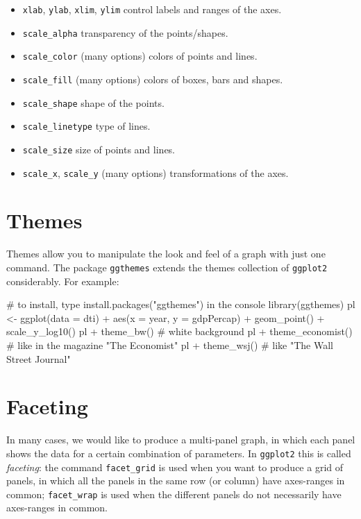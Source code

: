 \documentclass[
  letterpaper,
  DIV=11,
  numbers=noendperiod]{scrreprt}
\newenvironment{Shaded}{\begin{snugshade}}{\end{snugshade}}
\newcommand{\NormalTok}[1]{\textcolor[rgb]{0.00,0.23,0.31}{#1}}
\providecommand{\tightlist}{%
  \setlength{\itemsep}{0pt}\setlength{\parskip}{0pt}}\usepackage{longtable,booktabs,array}
\begin{document}
\begin{itemize}
\tightlist
\item
  \texttt{xlab}, \texttt{ylab}, \texttt{xlim}, \texttt{ylim} control
  labels and ranges of the axes.
\item
  \texttt{scale\_alpha} transparency of the points/shapes.
\item
  \texttt{scale\_color} (many options) colors of points and lines.
\item
  \texttt{scale\_fill} (many options) colors of boxes, bars and shapes.
\item
  \texttt{scale\_shape} shape of the points.
\item
  \texttt{scale\_linetype} type of lines.
\item
  \texttt{scale\_size} size of points and lines.
\item
  \texttt{scale\_x}, \texttt{scale\_y} (many options) transformations of
  the axes.
\end{itemize}

\section{Themes}\label{themes}

Themes allow you to manipulate the look and feel of a graph with just
one command. The package \texttt{ggthemes} extends the themes collection
of \texttt{ggplot2} considerably. For example:

\begin{Shaded}
\begin{Highlighting}[]
\NormalTok{\# to install, type install.packages("ggthemes") in the console}
\NormalTok{library(ggthemes)}
\NormalTok{pl \textless{}{-} ggplot(data = dti) + aes(x = year, y = gdpPercap) +}
\NormalTok{    geom\_point() + scale\_y\_log10()}
\NormalTok{pl + theme\_bw() \# white background}
\NormalTok{pl + theme\_economist() \# like in the magazine "The Economist"}
\NormalTok{pl + theme\_wsj() \# like "The Wall Street Journal"}
\end{Highlighting}
\end{Shaded}

\section{Faceting}\label{faceting}

In many cases, we would like to produce a multi-panel graph, in which
each panel shows the data for a certain combination of parameters. In
\texttt{ggplot2} this is called \emph{faceting}: the command
\texttt{facet\_grid} is used when you want to produce a grid of panels,
in which all the panels in the same row (or column) have axes-ranges in
common; \texttt{facet\_wrap} is used when the different panels do not
necessarily have axes-ranges in common.
\end{document}
